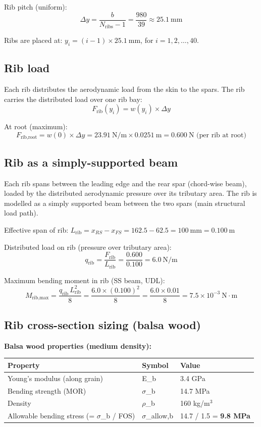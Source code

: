 \documentclass[10pt,a4paper]{article}
\begin{document}
Rib pitch (uniform):
\[
\Delta y = \frac{b}{N_{\text{ribs}} - 1} = \frac{980}{39} \approx 25.1\ \text{mm}
\]

Ribs are placed at: $y_i = (i-1) \times 25.1\ \text{mm}$, for $i = 1, 2, \ldots, 40$.

\subsection{Rib load}

Each rib distributes the aerodynamic load from the skin to the spars. The rib carries the distributed load over one rib bay:
\[
F_{\text{rib}}(y_i) = w(y_i) \times \Delta y
\]

At root (maximum):
\[
F_{\text{rib,root}} = w(0) \times \Delta y = 23.91\ \text{N/m} \times 0.0251\ \text{m} = 0.600\ \text{N (per rib at root)}
\]

\subsection{Rib as a simply-supported beam}

Each rib spans between the leading edge and the rear spar (chord-wise beam), loaded by the distributed aerodynamic pressure over its tributary area. The rib is modelled as a simply supported beam between the two spars (main structural load path).

Effective span of rib: $L_{\text{rib}} = x_{RS} - x_{FS} = 162.5 - 62.5 = 100\ \text{mm} = 0.100\ \text{m}$

Distributed load on rib (pressure over tributary area):
\[
q_{\text{rib}} = \frac{F_{\text{rib}}}{L_{\text{rib}}} = \frac{0.600}{0.100} = 6.0\ \text{N/m}
\]

Maximum bending moment in rib (SS beam, UDL):
\[
M_{\text{rib,max}} = \frac{q_{\text{rib}}\, L_{\text{rib}}^2}{8} = \frac{6.0 \times (0.100)^2}{8} = \frac{6.0 \times 0.01}{8} = 7.5 \times 10^{-3}\ \text{N}\cdot\text{m}
\]

\subsection{Rib cross-section sizing (balsa wood)}

\textbf{Balsa wood properties (medium density):}

\begin{center}
\begin{tabular}{|l|l|l|}
\hline
Property & Symbol & Value \\
\hline
Young's modulus (along grain) & E\_b & 3.4 GPa \\
\hline
Bending strength (MOR) & ${\sigma}$\_b & 14.7 MPa \\
\hline
Density & ${\rho}$\_b & 160 kg/m$^{3}$ \\
\hline
Allowable bending stress (= ${\sigma}$\_b / FOS) & ${\sigma}$\_allow,b & 14.7 / 1.5 = \textbf{9.8 MPa} \\
\hline
\end{tabular}
\end{center}
\end{document}
